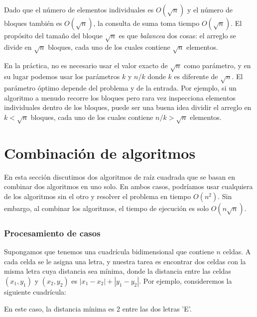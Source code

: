 Dado que el número de elementos individuales es $O(\sqrt n)$
y el número de bloques también es $O(\sqrt n)$,
la consulta de suma toma tiempo $O(\sqrt n)$.
El propósito del tamaño del bloque $\sqrt n$ es
que \emph{balancea} dos cosas:
el arreglo se divide en $\sqrt n$ bloques,
cada uno de los cuales contiene $\sqrt n$ elementos.

En la práctica, no es necesario usar el
valor exacto de $\sqrt n$ como parámetro,
y en su lugar podemos usar los parámetros $k$ y $n/k$ donde $k$ es
diferente de $\sqrt n$.
El parámetro óptimo depende del problema y de la entrada.
Por ejemplo, si un algoritmo a menudo recorre
los bloques pero rara vez inspecciona
elementos individuales dentro de los bloques,
puede ser una buena idea dividir el arreglo en
$k < \sqrt n$ bloques, cada uno de los cuales contiene $n/k > \sqrt n$
elementos.

\section{Combinación de algoritmos}

En esta sección discutimos dos algoritmos de raíz cuadrada
que se basan en combinar dos algoritmos en uno solo.
En ambos casos, podríamos usar cualquiera de los algoritmos
sin el otro y resolver el problema en tiempo $O(n^2)$.
Sin embargo, al combinar los algoritmos, el tiempo de ejecución
es solo $O(n \sqrt n)$.

\subsubsection{Procesamiento de casos}

Supongamos que tenemos una cuadrícula bidimensional
que contiene $n$ celdas.
A cada celda se le asigna una letra,
y nuestra tarea es encontrar dos celdas
con la misma letra cuya distancia sea mínima,
donde la distancia entre las celdas
$(x_1,y_1)$ y $(x_2,y_2)$ es $|x_1-x_2|+|y_1-y_2|$.
Por ejemplo, consideremos la siguiente cuadrícula:

\begin{center}
\end{center}
En este caso, la distancia mínima es 2 entre las dos letras 'E'.

